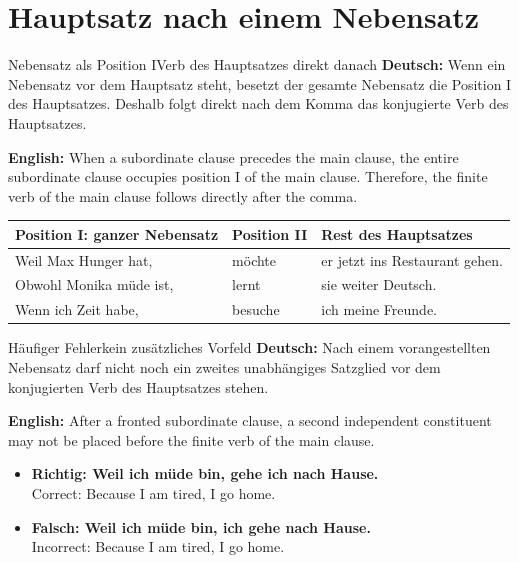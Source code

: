 \documentclass[a4paper,11pt]{article}
\newcommand{\GermanText}[1]{\textbf{Deutsch: }#1\par}
\newcommand{\EnglishText}[1]{{\small\color{SoftGray}\textbf{English: }#1\par}}
\newcommand{\ExampleItem}[2]{\item \textbf{#1}\\{\small\color{SoftGray}#2}}
\newcommand{\TableHeader}[1]{\color{white}\textbf{#1}}
\begin{document}
    \section{Hauptsatz nach einem Nebensatz}
        
        \begin{grammarentry}{Nebensatz als Position I}{Verb des Hauptsatzes direkt danach}
            \GermanText{Wenn ein Nebensatz vor dem Hauptsatz steht, besetzt der gesamte Nebensatz die Position I des Hauptsatzes. Deshalb folgt direkt nach dem Komma das konjugierte Verb des Hauptsatzes.}
            \EnglishText{When a subordinate clause precedes the main clause, the entire subordinate clause occupies position I of the main clause. Therefore, the finite verb of the main clause follows directly after the comma.}
        \end{grammarentry}
        
        \begin{longtable}{|p{6.0cm}|p{2.8cm}|p{5.6cm}|}
            \hline
            \rowcolor{HeaderBlueDark}
            \TableHeader{Position I: ganzer Nebensatz} & \TableHeader{Position II} & \TableHeader{Rest des Hauptsatzes} \\
            \hline
            Weil Max Hunger hat, & möchte & er jetzt ins Restaurant gehen. \\
            \hline
            Obwohl Monika müde ist, & lernt & sie weiter Deutsch. \\
            \hline
            Wenn ich Zeit habe, & besuche & ich meine Freunde. \\
            \hline
        \end{longtable}
        
        \begin{grammarentry}{Häufiger Fehler}{kein zusätzliches Vorfeld}
            \GermanText{Nach einem vorangestellten Nebensatz darf nicht noch ein zweites unabhängiges Satzglied vor dem konjugierten Verb des Hauptsatzes stehen.}
            \EnglishText{After a fronted subordinate clause, a second independent constituent may not be placed before the finite verb of the main clause.}
        \end{grammarentry}
        
        \begin{exbox}
            \begin{itemize}
                \ExampleItem{Richtig: Weil ich müde bin, gehe ich nach Hause.}{Correct: Because I am tired, I go home.}
                \ExampleItem{Falsch: Weil ich müde bin, ich gehe nach Hause.}{Incorrect: Because I am tired, I go home.}
            \end{itemize}
        \end{exbox}
    
\end{document}
